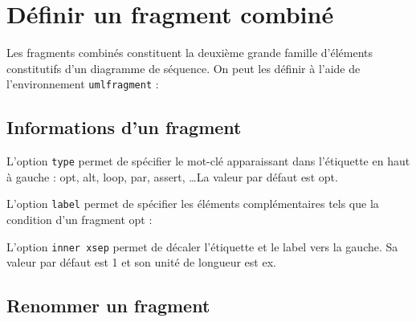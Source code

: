 \documentclass[a4paper,11pt]{report}
\newcommand{\inputTikZ}[1]{%
  }%
\newcommand{\inputTikZ}[1]{%
    \texttt{[image: fig/\#1.pdf]}%
  }%
\begin{document}
\section{Définir un fragment combiné}\label{s.fragments}

Les fragments combinés constituent la deuxième grande famille d'éléments constitutifs d'un diagramme de séquence. On peut les définir à l'aide de l'environnement {\tt umlfragment} :

\medskip

\begin{minipage}{0.5\textwidth}

\end{minipage}
\begin{minipage}{0.5\textwidth}
\begin{center}
\inputTikZ{fragment}
\end{center}
\end{minipage}

\subsection{Informations d'un fragment}\label{ss.fraginfos}

L'option {\tt type} permet de spécifier le mot-clé apparaissant dans l'étiquette en haut à gauche : opt, alt, loop, par, assert, \ldots La valeur par défaut est opt.

L'option {\tt label} permet de spécifier les éléments complémentaires tels que la condition d'un fragment opt : 

\medskip

\begin{minipage}{0.5\textwidth}

\end{minipage}
\begin{minipage}{0.5\textwidth}
\begin{center}
\inputTikZ{fragmentlabel}
\end{center}
\end{minipage}

\medskip

L'option {\tt inner xsep} permet de décaler l'étiquette et le label vers la gauche. Sa valeur par défaut est 1 et son unité de longueur est ex.

\subsection{Renommer un fragment}\label{ss.fragname}
\end{document}
